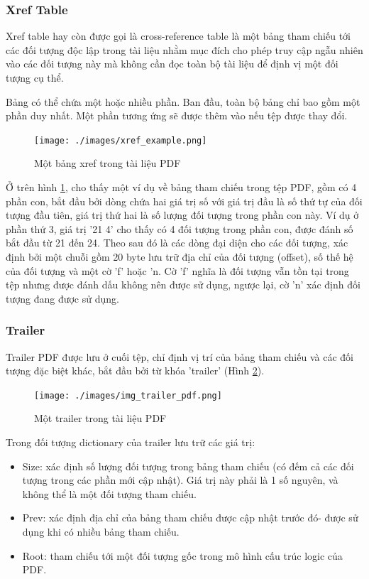 \documentclass[./../main.tex]{subfiles}
\begin{document}
\subsubsection*{Xref Table}
Xref table hay còn được gọi là cross-reference table là một bảng tham chiếu tới các đối tượng độc lập trong tài liệu nhằm mục đích cho phép truy cập ngẫu nhiên vào các đối tượng này mà không cần đọc toàn bộ tài liệu để định vị một đối tượng cụ thể.

Bảng có thể chứa một hoặc nhiều phần. Ban đầu, toàn bộ bảng chỉ bao gồm một phần duy nhất. Một phần tương ứng sẽ được thêm vào nếu tệp được thay đổi.
\begin{figure}[ht!]
	\centering
	\texttt{[image: ./images/xref\_example.png]}
	\caption{Một bảng xref trong tài liệu PDF}
	\label{fig:xreftable}
\end{figure}

Ở trên hình \ref{fig:xreftable}, cho thấy một ví dụ về bảng tham chiếu trong tệp PDF, gồm có 4 phần con, bắt đầu bởi dòng chứa hai giá trị số với giá trị đầu là số thứ tự của đối tượng đầu tiên, giá trị thứ hai là số lượng đối tượng trong phần con này. Ví dụ ở phần thứ 3, giá trị '21 4' cho thấy có 4 đối tượng trong phần con, được đánh số bắt đầu từ 21 đến 24. Theo sau đó là các dòng đại diện cho các đối tượng, xác định bởi một chuỗi gồm 20 byte lưu trữ địa chỉ của đối tượng (offset), số thế hệ của đối tượng và một cờ 'f' hoặc 'n. Cờ 'f' nghĩa là đối tượng vẫn tồn tại trong tệp nhưng được đánh dấu không nên được sử dụng, ngược lại, cờ 'n' xác định đối tượng đang được sử dụng.

\subsubsection*{Trailer}

Trailer PDF được lưu ở cuối tệp, chỉ định vị trí của bảng tham chiếu và các đối tượng đặc biệt khác, bắt đầu bởi từ khóa 'trailer' (Hình \ref{fig:trailer}).

\begin{figure}[ht!]
	\centering
	\texttt{[image: ./images/img\_trailer\_pdf.png]}
	\caption{Một trailer trong tài liệu PDF}
	\label{fig:trailer}
\end{figure}

Trong đối tượng dictionary của trailer lưu trữ các giá trị:

\begin{itemize}
	\item Size: xác định số lượng đối tượng trong bảng tham chiếu (có đếm cả các đối tượng trong các phần mới cập nhật). Giá trị này phải là 1 số nguyên, và không thể là một đối tượng tham chiếu.
	\item Prev: xác định địa chỉ của bảng tham chiếu được cập nhật trước đó- được sử dụng khi có nhiều bảng tham chiếu.
	\item Root: tham chiếu tới một đối tượng gốc trong mô hình cấu trúc logic của PDF.
\end{itemize}
\end{document}
